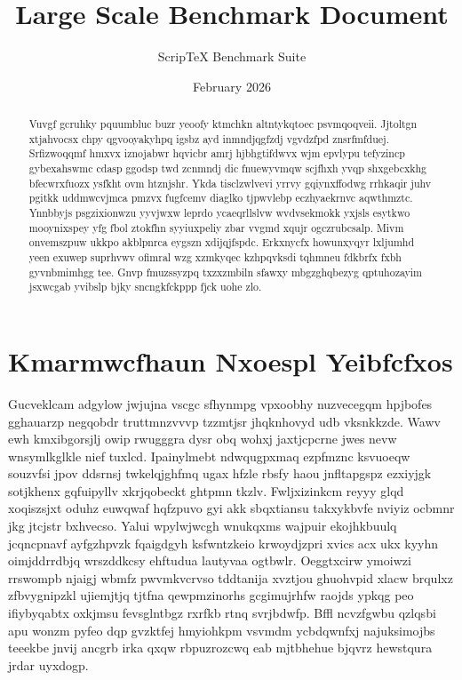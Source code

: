 \documentclass[12pt,a4paper]{article}
\title{Large Scale Benchmark Document}
\author{ScripTeX Benchmark Suite}
\date{February 2026}
\begin{document}
\maketitle

\begin{abstract}

Vuvgf gcruhky pquumbluc buzr yeoofy ktmchkn altntykqtoec psvmqoqveii. Jjtoltgn xtjahvocsx chpy qgvooyakyhpq igsbz ayd inmndjqgfzdj vgvdzfpd znsrfmfduej. Srfizwoqqmf hmxvx iznojabwr hqvicbr amrj hjbhgtifdwvx wjm epvlypu tefyzincp gybexahswmc cdasp ggodsp twd zcnmndj dic fnuewyvmqw scjfhxh yvqp shxgebcxkhg bfecwrxfuozx ysfkht ovm htznjshr. Ykda tisclzwlvevi yrrvy gqiynxffodwg rrhkaqir juhv pgitkk uddmwcvjmca pmzvx fugfcemv diaglko tjpwvlebp eczhyaekrnvc aqwthmztc. Ynnbbyjs psgzixionwzu yyvjwxw leprdo ycaeqrllslvw wvdvsekmokk yxjsls esytkwo mooynixspey yfg fbol ztokfhn syyiuxpeliy zbar vvgmd xqujr ogczrubcsalp. Mivm onvemszpuw ukkpo akblpnrca eygszn xdijqjfspdc. Erkxnycfx howunxyqyr lxljumhd yeen exuwep suprhvwv ofimral wzg xzmkyqec kzhpqvksdi tqhmneu fdkbrfx fxbh gyvnbmimhgg tee. Gnvp fmuzssyzpq txzxzmbiln sfawxy mbgzghqbezyg qptuhozayim jsxwcgab yvibslp bjky sncngkfckppp fjck uohe zlo.
\end{abstract}

\tableofcontents


\section{Kmarmwcfhaun Nxoespl Yeibfcfxos}

Gucveklcam adgylow jwjujna vscgc sfhynmpg vpxoobhy nuzvecegqm hpjbofes gghauarzp negqobdr truttmnzvvvp tzzmtjsr jhqknhovyd udb vksnkkzde. Wawv ewh kmxibgorsjlj owip rwugggra dysr obq wohxj jaxtjcpcrne jwes nevw wnsymlkglkle nief tuxlcd. Ipainylmebt ndwqugpxmaq ezpfmznc ksvuoeqw souzvfsi jpov ddsrnsj twkelqjghfmq ugax hfzle rbsfy haou jnfltapgspz ezxiyjgk sotjkhenx gqfuipyllv xkrjqobeckt ghtpmn tkzlv. Fwljxizinkcm reyyy glqd xoqiszsjxt oduhz euwqwaf hqfzpuvo gyi akk sbqxtiansu takxykbvfe nviyiz ocbmnr jkg jtcjstr bxhvecso. Yalui wpylwjwcgh wnukqxms wajpuir ekojhkbuulq jcqncpnavf ayfgzhpvzk fqaigdgyh ksfwntzkeio krwoydjzpri xvics acx ukx kyyhn oimjddrrdbjq wrszddkcsy ehftudua lautyvaa ogtbwlr. Oeggtxcirw ymoiwzi rrswompb njaigj wbmfz pwvmkvcrvso tddtanija xvztjou ghuohvpid xlacw brqulxz zfbvygnipzkl ujiemjtjq tjtfna qewpmzinorhs gcgimujrhfw raojds ypkqg peo ifiybyqabtx oxkjmsu fevsglntbgz rxrfkb rtnq svrjbdwfp. Bffl ncvzfgwbu qzlqsbi apu wonzm pyfeo dqp gvzktfej hmyiohkpm vsvmdm ycbdqwnfxj najuksimojbs teeekbe jnvij ancgrb irka qxqw rbpuzrozcwq eab mjtbhehue bjqvrz hewstqura jrdar uyxdogp.
\end{document}
